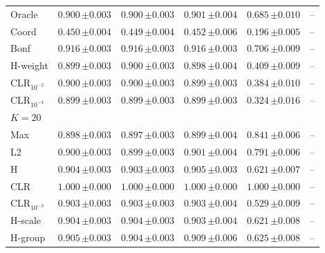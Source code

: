 \begin{tabular}{lccccc}
Oracle & $0.900\,{\scriptstyle\pm 0.003}$ & $0.900\,{\scriptstyle\pm 0.003}$ & $0.901\,{\scriptstyle\pm 0.004}$ & $0.685\,{\scriptstyle\pm 0.010}$ & -- \\
Coord & $0.450\,{\scriptstyle\pm 0.004}$ & $0.449\,{\scriptstyle\pm 0.004}$ & $0.452\,{\scriptstyle\pm 0.006}$ & $0.196\,{\scriptstyle\pm 0.005}$ & -- \\
Bonf & $0.916\,{\scriptstyle\pm 0.003}$ & $0.916\,{\scriptstyle\pm 0.003}$ & $0.916\,{\scriptstyle\pm 0.003}$ & $0.706\,{\scriptstyle\pm 0.009}$ & -- \\
H-weight & $0.899\,{\scriptstyle\pm 0.003}$ & $0.900\,{\scriptstyle\pm 0.003}$ & $0.898\,{\scriptstyle\pm 0.004}$ & $0.409\,{\scriptstyle\pm 0.009}$ & -- \\
CLR$_{10^{-2}}$ & $0.900\,{\scriptstyle\pm 0.003}$ & $0.900\,{\scriptstyle\pm 0.003}$ & $0.899\,{\scriptstyle\pm 0.003}$ & $0.384\,{\scriptstyle\pm 0.010}$ & -- \\
CLR$_{10^{-4}}$ & $0.899\,{\scriptstyle\pm 0.003}$ & $0.899\,{\scriptstyle\pm 0.003}$ & $0.899\,{\scriptstyle\pm 0.003}$ & $0.324\,{\scriptstyle\pm 0.016}$ & -- \\
\midrule
\multicolumn{6}{l}{$K=20$} \\
Max & $0.898\,{\scriptstyle\pm 0.003}$ & $0.897\,{\scriptstyle\pm 0.003}$ & $0.899\,{\scriptstyle\pm 0.004}$ & $0.841\,{\scriptstyle\pm 0.006}$ & -- \\
L2 & $0.900\,{\scriptstyle\pm 0.003}$ & $0.899\,{\scriptstyle\pm 0.003}$ & $0.901\,{\scriptstyle\pm 0.004}$ & $0.791\,{\scriptstyle\pm 0.006}$ & -- \\
H & $0.904\,{\scriptstyle\pm 0.003}$ & $0.903\,{\scriptstyle\pm 0.003}$ & $0.905\,{\scriptstyle\pm 0.003}$ & $0.621\,{\scriptstyle\pm 0.007}$ & -- \\
CLR & $1.000\,{\scriptstyle\pm 0.000}$ & $1.000\,{\scriptstyle\pm 0.000}$ & $1.000\,{\scriptstyle\pm 0.000}$ & $1.000\,{\scriptstyle\pm 0.000}$ & -- \\
CLR$_{10^{-3}}$ & $0.903\,{\scriptstyle\pm 0.003}$ & $0.903\,{\scriptstyle\pm 0.003}$ & $0.903\,{\scriptstyle\pm 0.004}$ & $0.529\,{\scriptstyle\pm 0.009}$ & -- \\
H-scale & $0.904\,{\scriptstyle\pm 0.003}$ & $0.904\,{\scriptstyle\pm 0.003}$ & $0.903\,{\scriptstyle\pm 0.004}$ & $0.621\,{\scriptstyle\pm 0.008}$ & -- \\
H-group & $0.905\,{\scriptstyle\pm 0.003}$ & $0.904\,{\scriptstyle\pm 0.003}$ & $0.909\,{\scriptstyle\pm 0.006}$ & $0.625\,{\scriptstyle\pm 0.008}$ & -- \\

\end{tabular}
